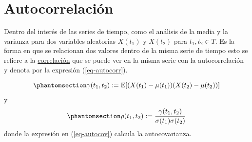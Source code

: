 \documentclass[
  us-letterpaper,
]{scrreprt}
\theoremstyle{plain}
\theoremstyle{definition}
\theoremstyle{definition}
\theoremstyle{remark}
\begin{document}
\section{Autocorrelación}\label{sec-autocorrelaciuxf3n}

\label{.remark}
Dentro del interés de las series de tiempo, como el análisis de la media
y la varianza para dos variables aleatorias \(X(t_1)\) y \(X(t_2)\) para
\(t_1,t_2 \in T.\) Es la forma en que se relacionan dos valores dentro
de la misma serie de tiempo esto se refiere a la
\hyperref[sec-correlacion]{correlación} que se puede ver en la misma
serie con la autocorrelación y denota por la expresión
(\ref{eq-autocorr}).

\begin{equation}\phantomsection\label{eq-autocov}{
\gamma(t_1,t_2):=\mathrm{E}[(X(t_1)-\mu(t_1))(X(t_2)-\mu(t_2))]
}\end{equation} y \begin{equation}\phantomsection\label{eq-autocorr}{
\rho(t_1,t_2):= \frac{\gamma(t_1,t_2)}{\sigma(t_1)\sigma(t_2)} 
}\end{equation} donde la expresión en (\ref{eq-autocov}) calcula la
autocovarianza.
\end{document}
